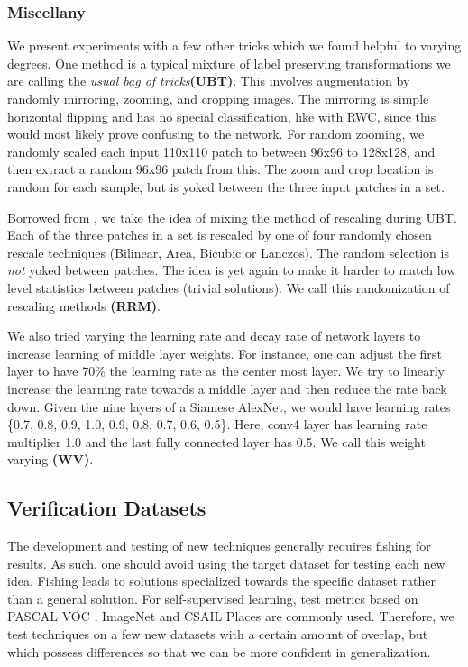 \documentclass[10pt,twocolumn,letterpaper]{article}
\begin{document}
\subsubsection{Miscellany}
  
 We present experiments with a few other tricks which we found helpful to varying degrees. One method is a typical mixture of label preserving transformations \cite{Simard03,Ciresan11,Ciresan12} we are calling the \emph{usual bag of tricks}{\bf (UBT)}. This involves augmentation by randomly mirroring, zooming, and cropping images. The mirroring is simple horizontal flipping and has no special classification, like with RWC, since this would most likely prove confusing to the network. For random zooming, we randomly scaled each input 110x110 patch to between 96x96 to 128x128, and then extract a random 96x96 patch from this. The zoom and crop location is random for each sample, but is yoked between the three input patches in a set.

Borrowed from \cite{Noroozi17}, we take the idea of mixing the method of rescaling during UBT. Each of the three patches in a set is rescaled by one of four randomly chosen rescale techniques (Bilinear, Area, Bicubic or Lanczos). The random selection is \emph{not} yoked between patches. The idea is yet again to make it harder to match low level statistics between patches (trivial solutions). We call this randomization of rescaling methods {\bf (RRM)}. 

We also tried varying the learning rate and decay rate of network layers to increase learning of middle layer weights. For instance, one can adjust the first layer to have 70\% the learning rate as the center most layer. We try to linearly increase the learning rate towards a middle layer and then reduce the rate back down. Given the nine layers of a Siamese AlexNet, we would have learning rates \{0.7, 0.8, 0.9, 1.0, 0.9, 0.8, 0.7, 0.6, 0.5\}. Here, conv4 layer has learning rate multiplier 1.0 and the last fully connected layer has 0.5. We call this weight varying {\bf (WV)}. 

\subsection{Verification Datasets}

The development and testing of new techniques generally requires fishing for results. As such, one should avoid using the target dataset for testing each new idea. Fishing leads to solutions specialized towards the specific dataset rather than a general solution. For self-supervised learning, test metrics based on PASCAL VOC \cite{Everingham10}, ImageNet \cite{Imagenet09} and CSAIL Places \cite{Places14} are commonly used. Therefore, we test techniques on a few new datasets with a certain amount of overlap, but which possess differences so that we can be more confident in generalization. 
\end{document}
